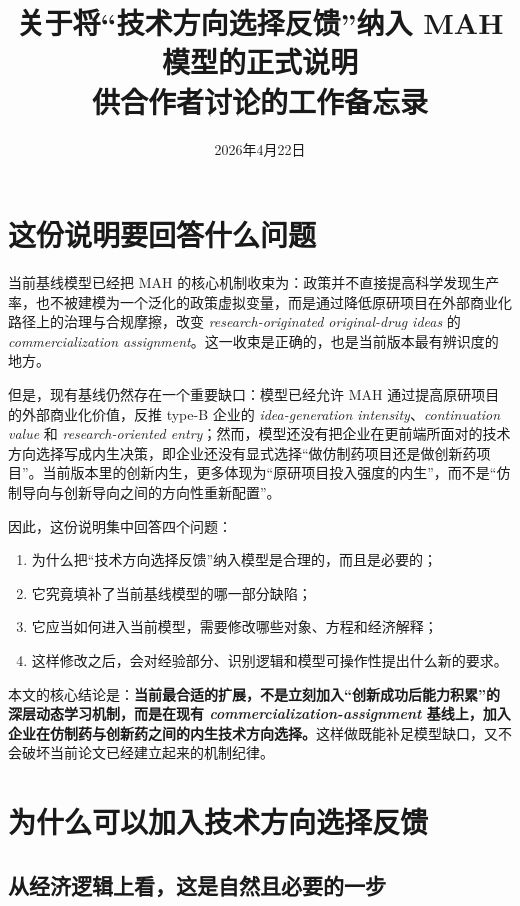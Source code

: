 \documentclass[12pt]{ctexart}
\title{关于将“技术方向选择反馈”纳入 MAH 模型的正式说明\\\large 供合作者讨论的工作备忘录}
\author{}
\date{2026年4月22日}
\begin{document}
\maketitle

\section{这份说明要回答什么问题}

当前基线模型已经把 MAH 的核心机制收束为：政策并不直接提高科学发现生产率，也不被建模为一个泛化的政策虚拟变量，而是通过降低原研项目在外部商业化路径上的治理与合规摩擦，改变 \textit{research-originated original-drug ideas} 的 \textit{commercialization assignment}。这一收束是正确的，也是当前版本最有辨识度的地方。

但是，现有基线仍然存在一个重要缺口：模型已经允许 MAH 通过提高原研项目的外部商业化价值，反推 type-B 企业的 \textit{idea-generation intensity}、\textit{continuation value} 和 \textit{research-oriented entry}；然而，模型还没有把企业在更前端所面对的技术方向选择写成内生决策，即企业还没有显式选择“做仿制药项目还是做创新药项目”。当前版本里的创新内生，更多体现为“原研项目投入强度的内生”，而不是“仿制导向与创新导向之间的方向性重新配置”。

因此，这份说明集中回答四个问题：
\begin{enumerate}[leftmargin=2em]
    \item 为什么把“技术方向选择反馈”纳入模型是合理的，而且是必要的；
    \item 它究竟填补了当前基线模型的哪一部分缺陷；
    \item 它应当如何进入当前模型，需要修改哪些对象、方程和经济解释；
    \item 这样修改之后，会对经验部分、识别逻辑和模型可操作性提出什么新的要求。
\end{enumerate}

本文的核心结论是：\textbf{当前最合适的扩展，不是立刻加入“创新成功后能力积累”的深层动态学习机制，而是在现有 \textit{commercialization-assignment} 基线上，加入企业在仿制药与创新药之间的内生技术方向选择。}这样做既能补足模型缺口，又不会破坏当前论文已经建立起来的机制纪律。

\section{为什么可以加入技术方向选择反馈}

\subsection{从经济逻辑上看，这是自然且必要的一步}
\end{document}
